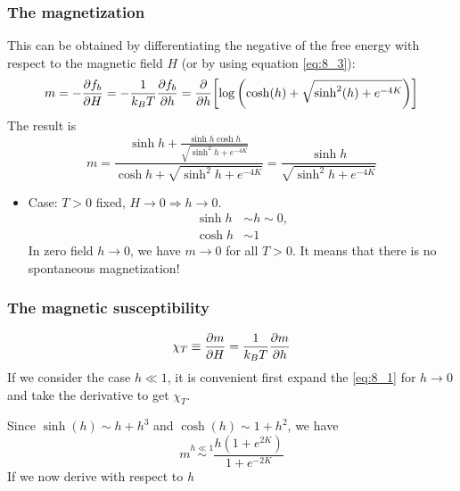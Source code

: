 \documentclass[../../Main/Main.tex]{subfiles}
\begin{document}
\subsubsection{The magnetization}
This can be obtained by differentiating the negative of the free energy with respect to the magnetic field \( H \) (or by using equation \eqref{eq:8_3}):
\begin{equation*}
  m = - \pdv{f_b}{H} = - \frac{1}{k_B T } \pdv{f_b}{h} = \pdv{}{h} \qty[  \log{\qty( \cosh(h)+\sqrt{\sinh^2(h)+e^{-4K}  } )} ]
\end{equation*}
The result is
\begin{equation}
  m =   \frac{\sinh h + \frac{ \sinh h \cosh h}{\sqrt{\sinh^2 h + e^{-4K} }} }{\cosh h + \sqrt{\sinh^2 h + e^{-4K} } } 
  = \frac{\sinh h  }{\sqrt{\sinh^2 h + e^{-4K} } }
  \label{eq:8_1}
\end{equation}
\begin{itemize}
\item Case: \( T>0 \) fixed, \( H \rightarrow 0 \Rightarrow h \rightarrow 0\).
\begin{subequations}
\begin{align*}
  \sinh h & \sim h \sim 0, \\ \cosh h &\sim 1
\end{align*}
\end{subequations}
In zero field \( h \rightarrow 0 \), we have \( m \rightarrow 0 \) for all \( T>0 \). It means that there is no spontaneous magnetization!
\end{itemize}


\subsubsection{The magnetic susceptibility}
\begin{equation}
  \chi_T  \equiv  \pdv{m}{H} = \frac{1}{k_B T} \pdv{m}{h}
\end{equation}
If we consider the case \( h \ll 1 \), it is convenient first expand the  \eqref{eq:8_1} for \( h \rightarrow 0 \) and take the derivative to get \( \chi _T \).

Since \( \sinh (h) \sim h+h^3 \) and \( \cosh (h) \sim 1 + h^2 \), we have
\begin{equation*}
  m \overset{h \ll 1}{\sim } \frac{h (1+e^{2K} )}{1+e^{-2K} }
\end{equation*}
If we now derive with respect to \emph{h}
\end{document}
